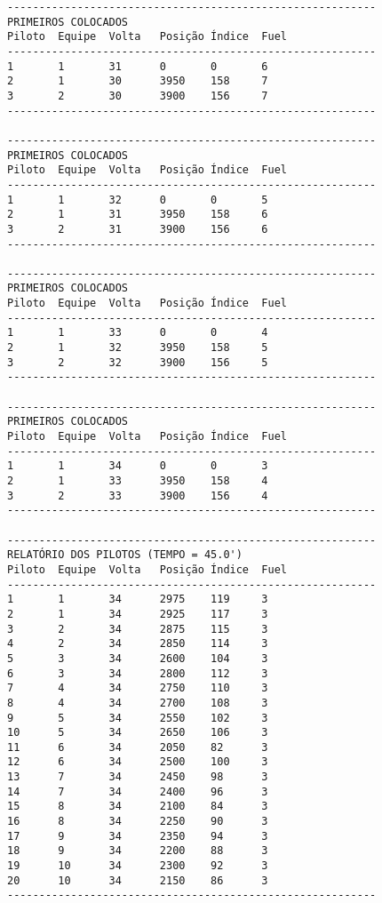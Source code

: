 \documentclass[12pt]{article}
\begin{document}
\begin{verbatim}
----------------------------------------------------------
PRIMEIROS COLOCADOS
Piloto  Equipe  Volta   Posição Índice  Fuel
----------------------------------------------------------
1       1       31      0       0       6
2       1       30      3950    158     7
3       2       30      3900    156     7
----------------------------------------------------------

----------------------------------------------------------
PRIMEIROS COLOCADOS
Piloto  Equipe  Volta   Posição Índice  Fuel
----------------------------------------------------------
1       1       32      0       0       5
2       1       31      3950    158     6
3       2       31      3900    156     6
----------------------------------------------------------

----------------------------------------------------------
PRIMEIROS COLOCADOS
Piloto  Equipe  Volta   Posição Índice  Fuel
----------------------------------------------------------
1       1       33      0       0       4
2       1       32      3950    158     5
3       2       32      3900    156     5
----------------------------------------------------------

----------------------------------------------------------
PRIMEIROS COLOCADOS
Piloto  Equipe  Volta   Posição Índice  Fuel
----------------------------------------------------------
1       1       34      0       0       3
2       1       33      3950    158     4
3       2       33      3900    156     4
----------------------------------------------------------

----------------------------------------------------------
RELATÓRIO DOS PILOTOS (TEMPO = 45.0')
Piloto  Equipe  Volta   Posição Índice  Fuel
----------------------------------------------------------
1       1       34      2975    119     3
2       1       34      2925    117     3
3       2       34      2875    115     3
4       2       34      2850    114     3
5       3       34      2600    104     3
6       3       34      2800    112     3
7       4       34      2750    110     3
8       4       34      2700    108     3
9       5       34      2550    102     3
10      5       34      2650    106     3
11      6       34      2050    82      3
12      6       34      2500    100     3
13      7       34      2450    98      3
14      7       34      2400    96      3
15      8       34      2100    84      3
16      8       34      2250    90      3
17      9       34      2350    94      3
18      9       34      2200    88      3
19      10      34      2300    92      3
20      10      34      2150    86      3
----------------------------------------------------------


\end{verbatim}
\end{document}
